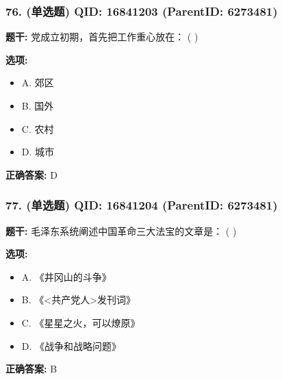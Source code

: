 \documentclass[12pt,UTF8]{ctexart}
\begin{document}
\vspace{0.3em}\hrulefill\vspace{0.7em}

\subsubsection*{76. (单选题) \small QID: 16841203 (ParentID: 6273481)}

\textbf{题干:}
党成立初期，首先把工作重心放在： ( )



\textbf{选项:}
\begin{itemize}[leftmargin=*]

  \item A. 郊区

  \item B. 国外

  \item C. 农村

  \item D. 城市

\end{itemize}

\textbf{正确答案:}
D

\vspace{0.3em}\hrulefill\vspace{0.7em}

\subsubsection*{77. (单选题) \small QID: 16841204 (ParentID: 6273481)}

\textbf{题干:}
毛泽东系统阐述中国革命三大法宝的文章是： ( )



\textbf{选项:}
\begin{itemize}[leftmargin=*]

  \item A. 《井冈山的斗争》

  \item B. 《<共产党人>发刊词》

  \item C. 《星星之火，可以燎原》

  \item D. 《战争和战略问题》

\end{itemize}

\textbf{正确答案:}
B

\vspace{0.3em}\hrulefill\vspace{0.7em}
\end{document}
